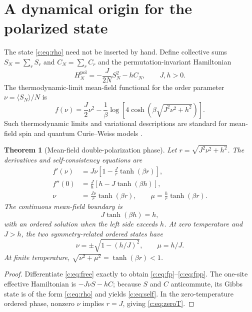 \documentclass[11pt]{article}
\newtheorem{theorem}{Theorem}[section]
\theoremstyle{remark}\newtheorem{remark}[theorem]{Remark}
\begin{document}
\section{A dynamical origin for the polarized state}

The state \eqref{c:eq:rho} need not be inserted by hand.  Define collective sums
$S_N=\sum_rS_r$ and $C_N=\sum_rC_r$ and the permutation-invariant Hamiltonian
\begin{equation}
H_N^{\mathrm{pol}}=-\frac{J}{2N}S_N^2-hC_N,\qquad J,h>0.
\label{c:eq:meanfieldH}
\end{equation}
The thermodynamic-limit mean-field functional for the order parameter
$\nu=\langle S_N\rangle/N$ is
\begin{equation}
f(\nu)=\frac J2\nu^2-\frac1\beta
\log\!\left[4\cosh\!\left(\beta\sqrt{J^2\nu^2+h^2}\right)\right].
\label{c:eq:free}
\end{equation}
Such thermodynamic limits and variational descriptions are standard for mean-field spin and quantum Curie--Weiss models \cite{Bianchi2003,Bapst2012}.

\begin{theorem}[Mean-field double-polarization phase]\label{c:thm:phase}
Let $r=\sqrt{J^2\nu^2+h^2}$.  The derivatives and self-consistency equations are
\begin{align}
f'(\nu)&=J\nu\left[1-\frac Jr\tanh(\beta r)\right],\label{c:eq:fp}\\
f''(0)&=\frac Jh\left[h-J\tanh(\beta h)\right],\label{c:eq:fpp}\\
\nu&=\frac{J\nu}{r}\tanh(\beta r),\qquad
\mu=\frac h r\tanh(\beta r).\label{c:eq:self}
\end{align}
The continuous mean-field boundary is
\begin{equation}
J\tanh(\beta h)=h,
\end{equation}
with an ordered solution when the left side exceeds $h$.  At zero temperature and $J>h$, the two symmetry-related ordered states have
\begin{equation}
\nu=\pm\sqrt{1-(h/J)^2},\qquad \mu=h/J.
\label{c:eq:zeroT}
\end{equation}
At finite temperature, $\sqrt{\nu^2+\mu^2}=\tanh(\beta r)<1$.
\end{theorem}

\begin{proof}
Differentiate \eqref{c:eq:free} exactly to obtain \eqref{c:eq:fp}--\eqref{c:eq:fpp}.  The one-site effective Hamiltonian is $-J\nu S-hC$; because $S$ and $C$ anticommute, its Gibbs state is of the form \eqref{c:eq:rho} and yields \eqref{c:eq:self}.  In the zero-temperature ordered phase, nonzero $\nu$ implies $r=J$, giving \eqref{c:eq:zeroT}.
\end{proof}
\end{document}
